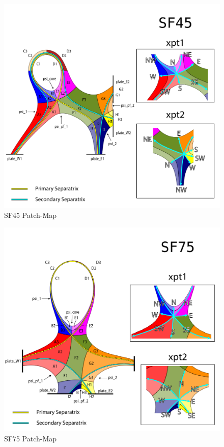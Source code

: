\begin{figure}[H]
    \centering
        \includegraphics[width=\textwidth]{figures/configurations/SF45_collection.pdf}
        \caption{SF45 Patch-Map}
        \label{fig:sf45_patch_map}
\end{figure}
\begin{figure}[H]
    \centering
        \includegraphics[width=\textwidth]{figures/configurations/SF75_collection.pdf}
        \caption{SF75 Patch-Map}
        \label{fig:sf75_patch_map}
\end{figure}
